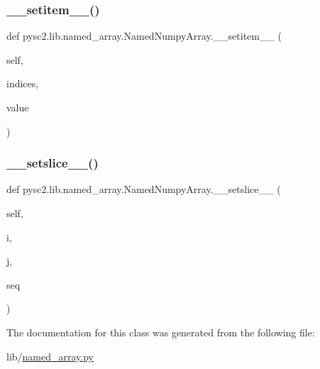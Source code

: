 \subsubsection{\texorpdfstring{\+\_\+\+\_\+setitem\+\_\+\+\_\+()}{\_\_setitem\_\_()}}
{\footnotesize\ttfamily def pysc2.\+lib.\+named\+\_\+array.\+Named\+Numpy\+Array.\+\_\+\+\_\+setitem\+\_\+\+\_\+ (\begin{DoxyParamCaption}\item[{}]{self,  }\item[{}]{indices,  }\item[{}]{value }\end{DoxyParamCaption})}

\mbox{\label{classpysc2_1_1lib_1_1named__array_1_1_named_numpy_array_a8642b7f0cc04d088f9e46ddf375cee65}} 
\subsubsection{\texorpdfstring{\+\_\+\+\_\+setslice\+\_\+\+\_\+()}{\_\_setslice\_\_()}}
{\footnotesize\ttfamily def pysc2.\+lib.\+named\+\_\+array.\+Named\+Numpy\+Array.\+\_\+\+\_\+setslice\+\_\+\+\_\+ (\begin{DoxyParamCaption}\item[{}]{self,  }\item[{}]{i,  }\item[{}]{j,  }\item[{}]{seq }\end{DoxyParamCaption})}



The documentation for this class was generated from the following file\+:\begin{DoxyCompactItemize}
\item 
lib/\mbox{\hyperlink{named__array_8py}{named\+\_\+array.\+py}}\end{DoxyCompactItemize}
